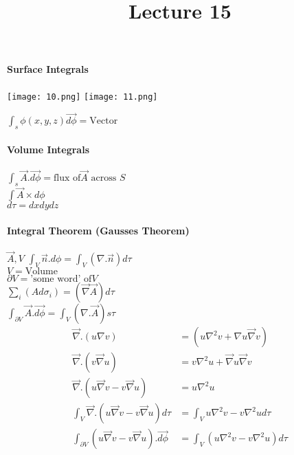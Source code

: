 \documentclass[12]{article}
\begin{document}
\title{Lecture 15}
\maketitle

\paragraph*{Surface Integrals}

\begin{center}
\texttt{[image: 10.png]}
\texttt{[image: 11.png]}
\end{center}

$\int_{s} \phi (x,y,z)\vec{d \phi}= \mbox{Vector}$

\paragraph*{Volume Integrals}
\begin{center}
$\int_{s} \vec{A}.\vec{d \phi}= \mbox{flux of$\vec{A}$ across $S$}$\\
$\int \vec{A} \times d \phi$\\
$d \tau = dx dy dz$
\end{center}

\paragraph*{Integral Theorem (Gausses Theorem)}
$\vec{A}, V$
$\int_{V} \vec{n}.d \phi = \int_{V}(\nabla . \vec{n})d \tau$\\
$V= \mbox{Volume}$\\
$\partial V = \mbox{'some word' of} V$\\


$\sum_{i}(A d \sigma_{i})=(\vec{\nabla} \vec{A}) d \tau$\\

$\int_{\partial V} \vec{A}.\vec{d \phi}=\int_{V}(\nabla . \vec{A})s \tau$\\

\begin{eqnarray}
\vec{\nabla}.(u \nabla v) &=(u \nabla^{2} v + \nabla u \vec{\nabla} v)\\
\vec{\nabla}.(v \vec{\nabla} u) &=v \nabla^{2}u+ \vec{\nabla}u \vec{\nabla}v\\
\vec{\nabla}.(u \vec{\nabla}v-v \vec{\nabla}u) &=u \nabla^{2}u\\
\int_{V} \vec{\nabla}.(u \vec{\nabla}v-v \vec{\nabla}u)d \tau &=\int_{V} u \nabla^{2}v - v \nabla^{2}u d \tau\\
\int_{\partial V} (u \vec{\nabla}v - v \vec{\nabla}u).\vec{d \phi} &=\int_{V}(u \nabla^{2}v - v \nabla^{2}u)d \tau
\end{eqnarray}
\end{document}

